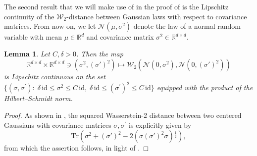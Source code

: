 \documentclass[12pt,oneside]{amsart}
\newtheorem{lemma}[theorem]{Lemma}
\theoremstyle{definition}
\newcommand{\id}{\mathrm{id}}
\newcommand{\W}{\mathcal W}
\newcommand{\R}{\mathbb R}
\newcommand{\trace}{\mathrm{Tr}}
\def\R{{\mathbb R}}
\numberwithin{equation}{section}
\begin{document}
The second result that we will make use of in the proof of  is the Lipschitz continuity of the $\W_2$-distance between Gaussian laws with respect to covariance matrices. From now on, we let $\mathcal N(\mu, \sigma^2)$ denote the law of a normal random variable with mean $\mu \in \R^d$ and covariance matrix $\sigma^2 \in \R^{d \times d}$.

\begin{lemma}
    \label{lem:Lipschitz_continuity_gaussians}
    Let $C, \delta > 0$.
    Then the map
    \begin{equation}
        \R^{d \times d} \times \R^{d \times d} \ni (\sigma^2, (\sigma')^2) \mapsto \mathcal W_2\!\left( \mathcal N(0,\sigma^2), \mathcal N(0,(\sigma')^2)\right)\!    
    \end{equation}
    is Lipschitz continuous on the set $\{(\sigma, \sigma^\prime) \colon \; \delta \, \id \leq \sigma^2 \leq C \, \id, \; \delta \, \id \leq (\sigma^\prime)^2 \leq C \, \id \}$ equipped with the product of the Hilbert--Schmidt norm.
\end{lemma}

\begin{proof}
    As shown in \cite[Proposition 7]{GiSh84}, the squared Wasserstein-2 distance between two centered Gaussians with covariance matrices $\sigma, \sigma^\prime$ is explicitly given by
    \begin{equation}
        \label{eq:Wasserstein_2_gaussians}        
        \trace \!\left( \sigma^2 + (\sigma')^2 - 2\!\left( \sigma (\sigma')^2 \sigma \right)\!^\frac12 \right)\!,
    \end{equation}
    from which the assertion follows, in light of .
\end{proof}
\end{document}
